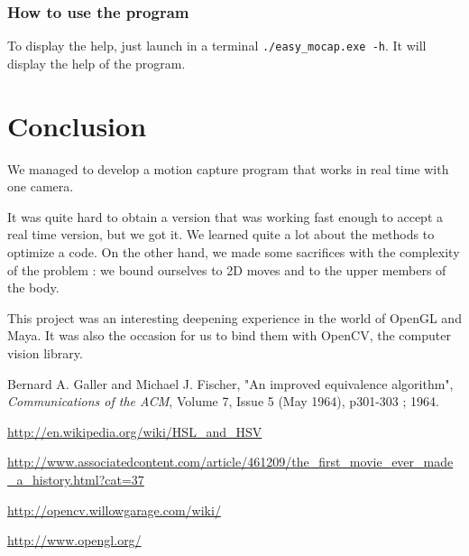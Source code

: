 \documentclass{article}
\begin{document}
        \subsubsection{How to use the program}
To display the help, just launch in a terminal \verb|./easy_mocap.exe -h|.
It will display the help of the program.

    \section*{Conclusion}

We managed to develop a motion capture program that works in real time with one camera.

It was quite hard to obtain a version that was working fast enough to accept a real time version, but we got it.
We learned quite a lot about the methods to optimize a code.
On the other hand, we made some sacrifices with the complexity of the problem :
we bound ourselves to 2D moves and to the upper members of the body.

This project was an interesting deepening experience in the world of OpenGL and Maya.
It was also the occasion for us to bind them with OpenCV, the computer vision library.

\pagebreak
\begin{thebibliography}{99}
    Bernard A. Galler and Michael J. Fischer, "An improved equivalence algorithm",
    {\it Communications of the ACM}, Volume 7, Issue 5 (May 1964), p301-303 ; 1964.

    \href{http://en.wikipedia.org/wiki/HSL\_and\_HSV}{http://en.wikipedia.org/wiki/HSL\_and\_HSV}

    \href{http://www.associatedcontent.com/article/461209/the\_first\_movie\_ever\_made\_a\_history.html?cat=37}
    {http://www.associatedcontent.com/article/461209/the\_first\_movie\_ever\_made\_a\_history.html?cat=37}

    \href{http://opencv.willowgarage.com/wiki/} {http://opencv.willowgarage.com/wiki/}

    \href{http://www.opengl.org/} {http://www.opengl.org/}

\end{thebibliography}

\end{document}
